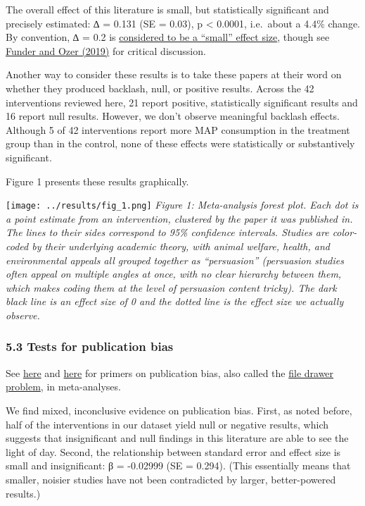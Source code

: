 \documentclass[
  letterpaper,
  DIV=11,
  numbers=noendperiod]{scrartcl}
\begin{document}
The overall effect of this literature is small, but statistically
significant and precisely estimated: ∆ = 0.131 (SE = 0.03), p
\textless{} 0.0001, i.e.~about a 4.4\% change. By convention, ∆ = 0.2 is
\href{https://www.ncbi.nlm.nih.gov/pmc/articles/PMC3444174/}{considered
to be a ``small'' effect size}, though see
\href{https://journals.sagepub.com/doi/10.1177/2515245919847202}{Funder
and Ozer (2019)} for critical discussion.

Another way to consider these results is to take these papers at their
word on whether they produced backlash, null, or positive results.
Across the 42 interventions reviewed here, 21 report positive,
statistically significant results and 16 report null results. However,
we don't observe meaningful backlash effects. Although 5 of 42
interventions report more MAP consumption in the treatment group than in
the control, none of these effects were statistically or substantively
significant.

Figure 1 presents these results graphically.

\texttt{[image: ../results/fig\_1.png]} \emph{Figure 1: Meta-analysis
forest plot. Each dot is a point estimate from an intervention,
clustered by the paper it was published in. The lines to their sides
correspond to 95\% confidence intervals. Studies are color-coded by
their underlying academic theory, with animal welfare, health, and
environmental appeals all grouped together as ``persuasion'' (persuasion
studies often appeal on multiple angles at once, with no clear hierarchy
between them, which makes coding them at the level of persuasion content
tricky). The dark black line is an effect size of 0 and the dotted line
is the effect size we actually observe.}

\hypertarget{tests-for-publication-bias}{%
\subsubsection{5.3 Tests for publication
bias}\label{tests-for-publication-bias}}

See
\href{https://bookdown.org/MathiasHarrer/Doing_Meta_Analysis_in_R/pub-bias.html}{here}
and \href{https://pubmed.ncbi.nlm.nih.gov/29141096/}{here} for primers
on publication bias, also called the
\href{https://psycnet.apa.org/record/1979-27602-001}{file drawer
problem}, in meta-analyses.

We find mixed, inconclusive evidence on publication bias. First, as
noted before, half of the interventions in our dataset yield null or
negative results, which suggests that insignificant and null findings in
this literature are able to see the light of day. Second, the
relationship between standard error and effect size is small and
insignificant: β = -0.02999 (SE = 0.294). (This essentially means that
smaller, noisier studies have not been contradicted by larger,
better-powered results.)
\end{document}
